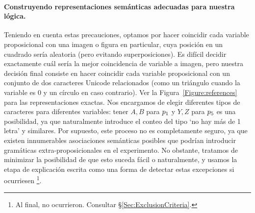 \paragraph{Construyendo representaciones semánticas adecuadas para nuestra lógica.}

Teniendo en cuenta estas precauciones, optamos por hacer coincidir cada variable proposicional con una imagen o figura en particular, cuya posición en un cuadrado sería aleatoria (pero evitando superposiciones). Es difícil decidir exactamente cuál sería la mejor coincidencia de variable a imagen, pero nuestra decisión final consiste en hacer coincidir cada variable proposicional con un conjunto de dos caracteres Unicode relacionados (como un triángulo cuando la variable es $ 0 $ y un círculo en caso contrario). Ver la Figura~\ref{Figure:references} para las representaciones exactas. Nos encargamos de elegir diferentes tipos de caracteres para diferentes variables: tener $ A, B $ para $ p_1 $ y $ Y, Z $ para $ p_5 $ es una posibilidad, ya que naturalmente introduce el conteo del tipo `no hay más de 1 letra' y similares. Por supuesto, este proceso no es completamente seguro, ya que existen innumerables asociaciones semánticas posibles que podrían introducir gramáticas extra-proposicionales en el experimento. No obstante, tratamos de minimizar la posibilidad de que esto suceda fácil o naturalmente, y usamos la etapa de explicación escrita como una forma de detectar estas excepciones si ocurriesen \footnote {Al final, no ocurrieron. Consultar \S\ref{Sec:ExclusionCriteria}.}.

